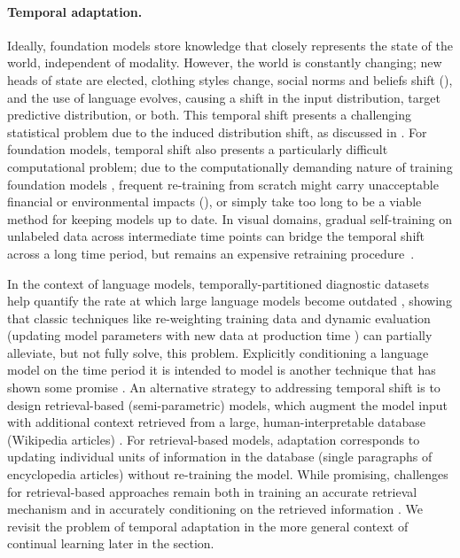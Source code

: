 \paragraph{Temporal adaptation.} Ideally, foundation models store knowledge that closely represents the state of the world, independent of modality. However, the world is constantly changing; new heads of state are elected, clothing styles change, social norms and beliefs shift (), and the use of language evolves, causing a shift in the input distribution, target predictive distribution, or both.
This temporal shift presents a challenging statistical problem due to the induced distribution shift, as discussed in . 
For foundation models, temporal shift also presents a particularly difficult computational problem; due to the computationally demanding nature of training foundation models \citep{shoeybi2019megatronlm,brown2020gpt3}, frequent re-training from scratch might carry unacceptable financial or environmental impacts \citep{bender2021} (), or simply take too long to be a viable method for keeping models up to date.
In visual domains, gradual self-training on unlabeled data across intermediate time points can bridge the temporal shift across a long time period, but remains an expensive retraining procedure~\citep{kumar2020gradual}. 

In the context of language models, temporally-partitioned diagnostic datasets help quantify the rate at which large language models become outdated \citep{lazaridou2021pitfalls,hombaiah2021dynamic,dhingra2021time}, showing that classic techniques like re-weighting training data and dynamic evaluation (updating model parameters with new data at production time \citep{mikolov2010recurrent}) can partially alleviate, but not fully solve, this problem. Explicitly conditioning a language model on the time period it is intended to model is another technique that has shown some promise \citep{dhingra2021time}.
An alternative strategy to addressing temporal shift is to design retrieval-based (semi-parametric) models, which augment the model input with additional context retrieved from a large, human-interpretable database (\eg Wikipedia articles) \citep{karpukhin2020dense,lewis2020retrieval,guu2020realm,Khandelwal2020Generalization,Khattab-etal:2020:OpenQA}.
For retrieval-based models, adaptation corresponds to updating individual units of information in the database (\eg single paragraphs of encyclopedia articles) without re-training the model. While promising, challenges for retrieval-based approaches remain both in training an accurate retrieval mechanism and in accurately conditioning on the retrieved information \citep{lewis2020retrieval}. We revisit the problem of temporal adaptation in the more general context of continual learning later in the section.


